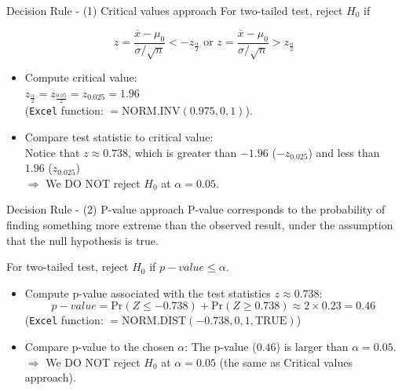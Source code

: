 \documentclass[
  10pt,
  ignorenonframetext,
]{beamer}
\providecommand{\tightlist}{%
  \setlength{\itemsep}{0pt}\setlength{\parskip}{0pt}}
\begin{document}
\begin{frame}[fragile]{Decision Rule - (1) Critical values approach}
\protect\hypertarget{decision-rule---1-critical-values-approach}{}
For two-tailed test, reject \(H_0\) if

\[
z = \frac{\bar{x}-\mu_0}{\sigma/\sqrt{n}} < -z_{\frac{\alpha}{2}} \text{ or } z = \frac{\bar{x}-\mu_0}{\sigma/\sqrt{n}} > z_{\frac{\alpha}{2}}
\]

\vspace{2mm}

\begin{itemize}
\tightlist
\item
  Compute critical value:\\
  \(z_{\frac{\alpha}{2}} = z_{\frac{0.05}{2}} = z_{0.025} = 1.96\)\\
  (\texttt{Excel} function: \(=\text{NORM.INV}(0.975,0,1)\)).
\end{itemize}

\vspace{2mm}

\begin{itemize}
\tightlist
\item
  Compare test statistic to critical value:\\
  Notice that \(z \approx 0.738\), which is greater than \(-1.96\)
  (\(-z_{0.025}\)) and less than \(1.96\) (\(z_{0.025}\))\\
  \(\Rightarrow\) We DO NOT reject \(H_0\) at \(\alpha = 0.05\).
\end{itemize}
\end{frame}

\begin{frame}[fragile]{Decision Rule - (2) P-value approach}
\protect\hypertarget{decision-rule---2-p-value-approach}{}
P-value corresponds to the probability of finding something more extreme
than the observed result, under the assumption that the null hypothesis
is true.

\vspace{2mm}

For two-tailed test, reject \(H_0\) if \(p-value \leq \alpha\).

\vspace{2mm}

\begin{itemize}
\item
  Compute p-value associated with the test statistics
  \(z \approx 0.738\): \[
  p-value = \text{Pr}(Z \leq -0.738) + \text{Pr}(Z \geq 0.738) \approx 2\times 0.23 = 0.46
  \] (\texttt{Excel} function:
  \(=\text{NORM.DIST}(-0.738,0,1,\text{TRUE})\))
\item
  Compare p-value to the chosen \(\alpha\): The p-value (\(0.46\)) is
  larger than \(\alpha = 0.05\). \(\Rightarrow\) We DO NOT reject
  \(H_0\) at \(\alpha = 0.05\) (the same as Critical values approach).
\end{itemize}
\end{frame}
\end{document}

